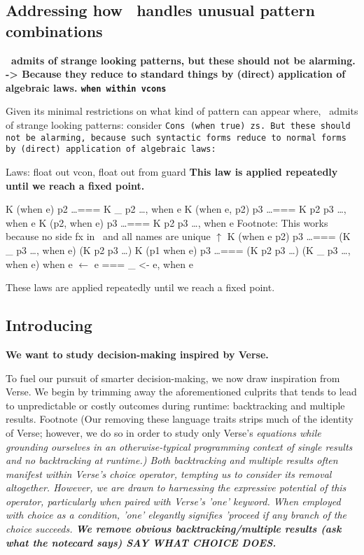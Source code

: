 \documentclass[manuscript,screen,review, 12pt]{acmart}
\begin{document}
\begin{outline}[enumerate]
    
\subsection{Addressing how \PPlus\ handles unusual pattern combinations}
 \bf{\PPlus\ admits of strange looking patterns, but these should not be alarming. }
 \bf{-> Because they reduce to standard things by (direct) application of algebraic laws. }
 \bf{\tt{when} within vcons }

    Given its minimal restrictions on what kind of pattern can appear where,
    \PPlus\ admits of strange looking patterns: consider \tt{Cons (when true)
    zs}. But these should not be alarming, because such syntactic forms reduce
    to normal forms by (direct) application of algebraic laws: 

    
         Laws: float out vcon, float out from guard
         \bf{This law is applied repeatedly until we reach a fixed point.}

         K (when e) p2 \dots === K \_ p2 \dots, when e
         K (when e, p2) p3 \dots  === K p2 p3 \dots, when e
         K (p2, when e) p3 \dots  === K p2 p3 \dots, when e
         Footnote: This works because no side fx in \PPlus\ and all names are unique $\uparrow$ 
         K (when e \pbar p2) p3 \dots === (K \_ p3 \dots, when e) \pbar (K p2 p3 \dots)
         K (p1 \pbar when e) p3 \dots === (K p2 p3 \dots) \pbar (K \_ p3 \dots, when e) 
         when e $\leftarrow$ e === \_ <- e, when e

        
        These laws are applied repeatedly until we reach a fixed point. 
        
\subsection{Introducing \VMinus\ }
 \bf{We want to study decision-making inspired by Verse. }
        
        To fuel our pursuit of smarter decision-making, we now draw inspiration
        from Verse. We begin by trimming away the aforementioned culprits that
        tends to lead to unpredictable or costly outcomes during runtime:
        backtracking and multiple results. Footnote (Our removing these language
        traits strips much of the identity of Verse; however, we do so in order
        to study only Verse's \it{equations} while grounding ourselves in an
        otherwise-typical programming context of single results and no
        backtracking at runtime.) Both backtracking and multiple results often
        manifest within Verse's choice operator, tempting us to consider its
        removal altogether. However, we are drawn to harnessing the expressive
        potential of this operator, particularly when paired with Verse's 'one'
        keyword. When employed with choice as a condition, 'one' elegantly
        signifies 'proceed if any branch of the choice succeeds.
         \bf{We remove obvious backtracking/multiple results (ask what the notecard says)}
        SAY WHAT CHOICE DOES. 


\end{outline}
\end{document}
